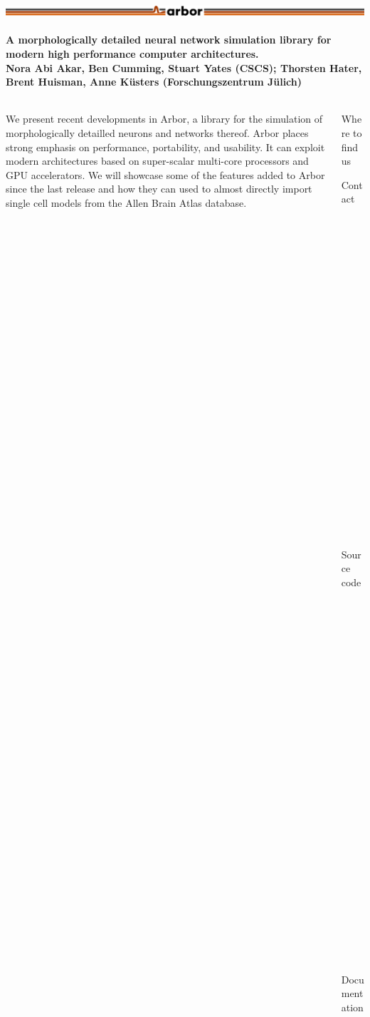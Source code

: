 \documentclass{beamer}
\begin{document}
\begin{frame}[t, fragile]
  \frametitle{\includegraphics[width=\linewidth]{img/arbor-lines-proto-colour-full}}
  \framesubtitle{A morphologically detailed neural network simulation library for modern high performance computer architectures.\\
    \tiny{Nora Abi Akar, Ben Cumming, Stuart Yates (CSCS); Thorsten Hater, Brent Huisman, Anne Küsters (Forschungszentrum Jülich)}}

  \begin{columns}
    \begin{column}{0.65\textwidth}
      We present recent developments in Arbor, a library for the simulation of
      morphologically detailled neurons and networks thereof. Arbor places strong
      emphasis on performance, portability, and usability. It can exploit modern
      architectures based on super-scalar multi-core processors and GPU accelerators.
      We will showcase some of the features added to Arbor since the last release and
      how they can used to almost directly import single cell models from the Allen
      Brain Atlas database.
    \end{column}
    \begin{column}{0.3\textwidth}
      \begin{block}{Where to find us}
        \begin{description}
          \item[Contact] arbor-sim@fz-juelich.de
          \item[Source code] github.com/arbor-sim/arbor
          \item[Documentation] arbor.readthedocs.io
        \end{description}
      \end{block}
    \end{column}
  \end{columns}

  \textbf{{\large{}}}\\
  \begin{columns}[onlytextwidth]
    \begin{column}{.49\linewidth}
      \textbf{}\\
    \end{column}
    \begin{column}{.49\linewidth}
      \textbf{}\\
      We provide an interface to collections of \emph{mechanisms} which describe
      processes both associated with an area density like ion channels and
      localised like synapses. These mechanisms are described in the NMODL DSL
      and translated into plain or vectorised C++ and CUDA for execution on GPUs.


\end{column}
\end{columns}
\end{frame}
\end{document}
